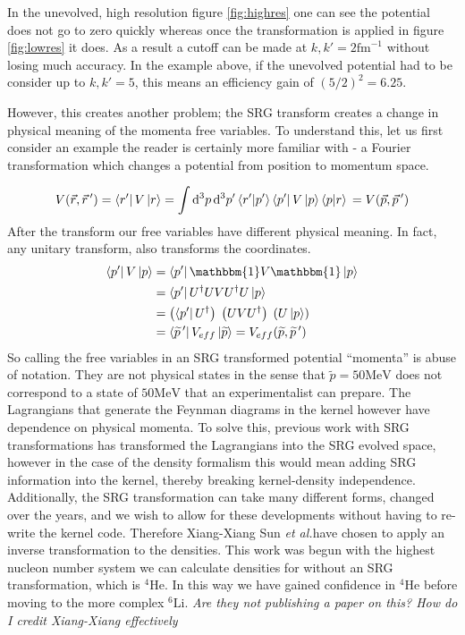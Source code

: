 \documentclass[a4paper,11pt]{article}
\newcommand{\dd}{\mathrm{d}}
\newcommand{\wtil}[1]{\widetilde{#1}}
\newcommand{\br}[1]{\left\langle #1 \right |}
\newcommand{\kt}[1]{\left| #1 \right \rangle}
\newcommand{\brkt}[2]{\left \langle #1 |#2 \right \rangle}
\newcommand{\etal}{\textit{et al.}}
\newcommand{\LiS}{{}^{6} \mathrm{Li} }
\newcommand{\HeF}{{}^{4} \mathrm{He}}
\newcommand{\ques}[1]{\color{red}\textit{ #1 }\color{black}}
\newcommand{\MeV}{\mathrm{MeV}}
\begin{document}
In the unevolved, high resolution figure \ref{fig:highres} one can
see the potential does not go to zero quickly whereas once the
transformation is applied in figure \ref{fig:lowres} it does. As a
result a cutoff can be made at $k,k'=2 \mathrm{fm}^{-1}$ without
losing much accuracy. In the example above, if the unevolved
potential had to be consider up to $k,k'=5$, this means an efficiency
gain of $(5/2)^2=6.25$.

However, this creates another problem; the SRG transform creates a
change in physical meaning of the momenta free variables.
To understand this, let us first consider an example the reader is
certainly more familiar with - a Fourier transformation which changes
a potential from position to momentum space.

\begin{equation}
  V(\vec{r},\vec{r}\,')= \br{r'} V \kt{r}=
  \int \dd^3p\, \dd^3p' \brkt{r'}{p'} \br{p'}V\kt{p} \brkt{p}{r}\\
  =V(\vec{p},\vec{p}\,')
\end{equation}
After the transform our free variables have different physical
meaning. In fact, any unitary transform, also transforms the coordinates.
\begin{align}
  \br{p'}V\kt{p} &= \br{p'} \mathbbm{1} V \mathbbm{1} \kt{p}\nonumber\\
  &= \br{p'} U^\dag U V U^\dag U \kt{p}\nonumber\\
  &= \left(\br{p'} U^\dag\right)\;\left( U V U^\dag\right)\;\left( U
  \kt{p}\right)\\
  &= \br{\widetilde{p}\,'} V_{eff}
  \kt{\widetilde{p}}=V_{eff}(\widetilde{p},\widetilde{p}\,')\nonumber
\end{align}
So calling the free variables in an SRG transformed potential
``momenta'' is abuse of notation.
They are not physical states in the sense that $\wtil{p}=50 \MeV$
does not correspond to a state of $50 \MeV$ that an experimentalist can prepare.
The Lagrangians that generate the Feynman diagrams in the kernel
however have dependence on physical momenta.
To solve this, previous work with SRG transformations has transformed
the Lagrangians into the SRG evolved space, however in
the case of the density formalism this would mean adding SRG
information into the kernel, thereby breaking kernel-density independence.
Additionally, the SRG transformation can take many different forms,
changed over the years, and we wish to allow for these developments
without having to re-write the kernel code.
Therefore Xiang-Xiang Sun \etal have chosen to apply an inverse
transformation to the densities.
This work was begun with the highest nucleon number system we can
calculate densities for without an SRG transformation, which is
$\HeF$. In this way we have gained confidence in $\HeF$ before moving
to the more complex $\LiS$.
\ques{Are they not publishing a paper on this? How do I credit
Xiang-Xiang effectively}
\end{document}

